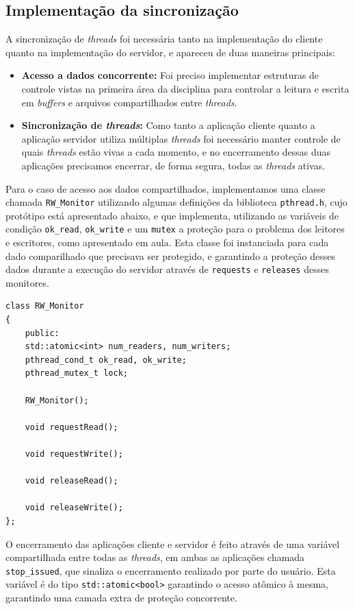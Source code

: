 \documentclass{article}
\begin{document}
\subsection{Implementação da sincronização}
A sincronização de \textit{threads} foi necessária tanto na implementação do cliente quanto na implementação do servidor, e apareceu de duas maneiras principais:
\begin{itemize}
    \item \textbf{Acesso a dados concorrente:} Foi preciso implementar estruturas de controle vistas na primeira área da disciplina para controlar a leitura e escrita em \textit{buffers} e arquivos compartilhados entre \textit{threads}.
    
    \item \textbf{Sincronização de \textit{threads}:} Como tanto a aplicação cliente quanto a aplicação servidor utiliza múltiplas \textit{threads} foi necessário manter controle de quais \textit{threads} estão vivas a cada momento, e no encerramento dessas duas aplicações precisamos encerrar, de forma segura, todas as \textit{threads} ativas.
\end{itemize}
\par Para o caso de acesso aos dados compartilhados, implementamos uma classe chamada \texttt{RW\_Monitor} utilizando algumas definições da biblioteca \texttt{pthread.h}, cujo protótipo está apresentado abaixo, e que implementa, utilizando as variáveis de condição \texttt{ok\_read}, \texttt{ok\_write} e um \texttt{mutex} a proteção para o problema dos leitores e escritores, como apresentado em aula. Esta classe foi instanciada para cada dado comparilhado que precisava ser protegido, e garantindo a proteção desses dados durante a execução do servidor através de \texttt{requests} e \texttt{releases} desses monitores.
\\
\begin{lstlisting}
class RW_Monitor
{
    public:
    std::atomic<int> num_readers, num_writers;
    pthread_cond_t ok_read, ok_write;
    pthread_mutex_t lock;

    RW_Monitor();

    void requestRead();

    void requestWrite();

    void releaseRead();

    void releaseWrite();
};
\end{lstlisting}
\par O encerramento das aplicações cliente e servidor é feito através de uma variável compartilhada entre todas as \textit{threads}, em ambas as aplicações chamada \texttt{stop\_issued}, que sinaliza o encerramento realizado por parte do usuário. Esta variável é do tipo \texttt{std::atomic<bool>} garantindo o acesso atômico à mesma, garantindo uma camada extra de proteção concorrente.
\end{document}
